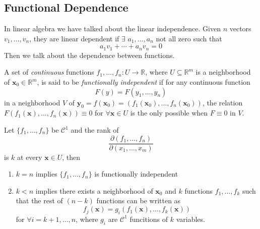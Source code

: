 \subsection{Functional Dependence}
In linear algebra we have talked about the linear independence. Given $n$ vectors $v_1,\dots,v_n$, they are linear dependent if $\exists$ $a_1,\dots,a_n$ not all zero such that
\[
a_1v_1+\cdots+a_nv_n=0
\]
Then we talk about the dependence between functions.
\begin{definition}[Dependence]
A set of \emph{continuous} functions $f_1,\dots,f_n: U\to\mathbb{R}$, where $U\subseteq\mathbb{R}^m$ is a neighborhood of $\bm x_0\in\mathbb{R}^m$, is said to be \emph{functionally independent} if for any continuous function
\[
F(y)=F(y_1,\dots,y_n)
\]
in a neighborhood $V$ of $\bm y_0=f(\bm x_0)=(f_1(\bm x_0),\dots,f_n(\bm x_0))$, the relation $F(f_1(\bm x),\dots,f_n(\bm x))\equiv0$ for $\forall \bm x\in U$ is the only possible when $F\equiv0$ in $V$.
\end{definition}
\begin{proposition}
Let $\{f_1,\dots,f_n\}$ be $\mathcal{C}^1$ and the rank of
\[
\frac{\partial (f_1,\dots,f_n)}{\partial(x_1,\dots,x_m)}
\]
is $k$ at every $\bm x\in U$, then 
\begin{enumerate}
\item
$k=n$ implies $\{f_1,\dots,f_n\}$ is functionally independent
\item
$k<n$ implies there exists a neighborhood of $\bm x_0$ and $k$ functions $f_1,\dots,f_k$ such that the rest of $(n-k)$ functions can be written as
\[
f_j(\bm x)=g_i(f_1(\bm x),\dots,f_k(\bm x))
\]
for $\forall i=k+1,\dots,n$, where $g_i$ are $\mathcal{C}^1$ funcitions of $k$ variables.
\end{enumerate}
\end{proposition}




















